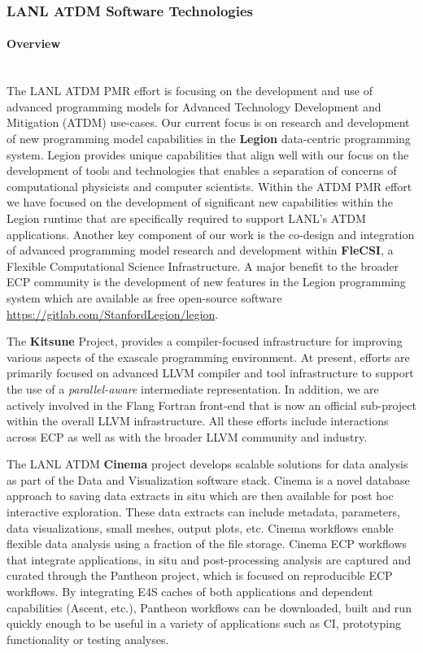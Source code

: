 \subsubsection{ LANL ATDM Software Technologies}

\paragraph{Overview} \leavevmode \\

The LANL ATDM PMR effort is focusing on the development and use of
advanced programming models for Advanced Technology Development and
Mitigation (ATDM) use-cases. Our current focus is on research and development
of new programming model capabilities in the \textbf{Legion} data-centric
programming system. Legion provides unique capabilities that align
well with our focus on the development of tools and technologies that
enables a separation of concerns of computational physicists and
computer scientists. Within the ATDM PMR effort we have focused on the
development of significant new capabilities within the Legion runtime
that are specifically required to support LANL's ATDM
applications. Another key component of our work is the co-design and
integration of advanced programming model research and development
within \textbf{FleCSI}, a Flexible Computational Science Infrastructure. A
major benefit to the broader ECP community is the development of new 
features in the Legion programming system which are available as free
open-source software \url{https://gitlab.com/StanfordLegion/legion}.  

The \textbf{Kitsune} Project, provides a compiler-focused infrastructure
for improving various aspects of the exascale programming environment.
At present, efforts are primarily focused on advanced LLVM compiler and
tool infrastructure to support the use of a \emph{parallel-aware} intermediate
representation.  In addition, we are actively involved in the Flang Fortran
front-end that is now an official sub-project within the overall LLVM
infrastructure. All these efforts include interactions across ECP as well as
with the broader LLVM community and industry.  


The LANL ATDM \textbf{Cinema} project develops scalable solutions for data analysis as part of the Data and Visualization software stack.
Cinema is a novel database approach to saving data extracts in situ which are then available for post hoc interactive exploration.  These data extracts can include metadata, parameters, data visualizations, small meshes, output plots, etc.  Cinema workflows enable flexible data analysis using a fraction of the file storage.  Cinema ECP workflows that integrate applications, in situ and post-processing analysis are captured and curated through the Pantheon project, which is focused on reproducible ECP workflows.  By integrating E4S caches of both applications and dependent capabilities (Ascent, etc.), Pantheon workflows can be downloaded, built and run quickly enough to be useful in a variety of applications such as CI, prototyping functionality or testing analyses.  

